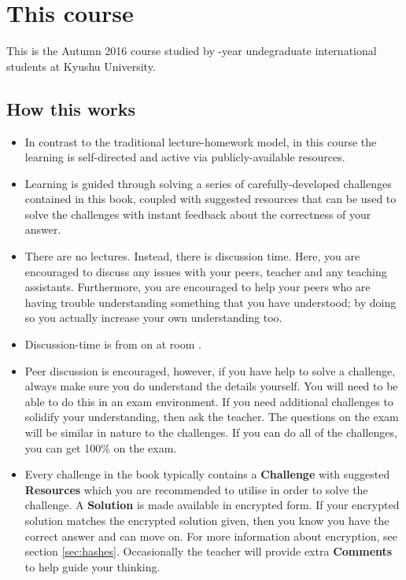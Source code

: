\section{This course}
This is the Autumn 2016 \course course studied by \nensei-year undegraduate international students at Kyushu University.

\subsection{How this works}
\begin{itemize}
    \item In contrast to the traditional lecture-homework model, in this course the learning is self-directed and active via publicly-available resources.
    \item Learning is guided through solving a series of carefully-developed challenges contained in this book, coupled with suggested resources that can be used to solve the challenges with instant feedback about the correctness of your answer.
    \item There are no lectures. Instead, there is discussion time. Here, you are encouraged to discuss any issues with your peers, teacher and any teaching assistants. Furthermore, you are encouraged to help your peers who are having trouble understanding something that you have understood; by doing so you actually increase your own understanding too.
    \item Discussion-time is from \disctime on \discdays at room \discroom.
    \item Peer discussion is encouraged, however, if you have help to solve a challenge, always make sure you do understand the details yourself. You will need to be able to do this in an exam environment. If you need additional challenges to solidify your understanding, then ask the teacher. The questions on the exam will be similar in nature to the challenges. If you can do all of the challenges, you can get 100\% on the exam.
    \item Every challenge in the book typically contains a \textbf{Challenge} with suggested \textbf{Resources} which you are recommended to utilise in order to solve the challenge. A \textbf{Solution} is made available in encrypted form. If your encrypted solution matches the encrypted solution given, then you know you have the correct answer and can move on. For more information about encryption, see section \ref{sec:hashes}. Occasionally the teacher will provide extra \textbf{Comments} to help guide your thinking.

\end{itemize}
